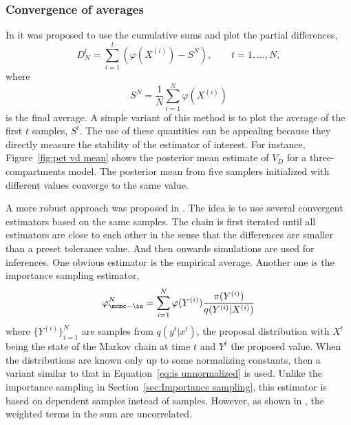 

\subsubsection{Convergence of averages}
\label{ssub:Convergence of averages}

In \cite{Yu:1998fn} it was proposed to use the cumulative sums and plot the
partial differences,
\begin{equation}
  D_N^t = \sum_{i=1}^t (\varphi(X^{(i)}) - S^N), \qquad t = 1,\dots,N,
\end{equation}
where
\begin{equation}
  S^N = \frac{1}{N}\sum_{i=1}^N \varphi(X^{(i)})
\end{equation}
is the final average. A simple variant of this method is to plot the average
of the first $t$ samples, $S^t$. The use of these quantities can be appealing
because they directly measure the stability of the estimator of interest. For
instance, Figure~\ref{fig:pet vd mean} shows the posterior mean estimate of
$V_D$ for a three-compartments \pet model. The posterior mean from five
samplers initialized with different values converge to the same value.



A more robust approach was proposed in \cite{Robert:1995ge}. The idea is to
use several convergent estimators based on the same samples. The chain is
first iterated until all estimators are close to each other in the sense that
the differences are smaller than a preset tolerance value. And then onwards
simulations are used for inferences. One obvious estimator is the empirical
average. Another one is the importance sampling estimator,
\begin{equation}
  \varphi_{\mcmc-\is}^N
  = \sum_{i=1}^N \varphi(Y^{(i)})\frac{\pi(Y^{(i)})}{q(Y^{(i)}|X^{(i)})}
  \label{eq:sn is}
\end{equation}
where $\{Y^{(i)}\}_{i=1}^N$ are samples from $q(y^t|x^t)$, the proposal
distribution with $X^t$ being the state of the Markov chain at time $t$ and
$Y^t$ the proposed value. When the distributions are known only up to some
normalizing constants, then a variant similar to that in Equation~\eqref{eq:is
  unnormalized} is used. Unlike the importance sampling in
Section~\ref{sec:Importance sampling}, this estimator is based on dependent
samples instead of \iid samples. However, as shown in
\cite[][Lemma~12.11]{Robert:2004tn}, the weighted terms in the sum are
uncorrelated.


